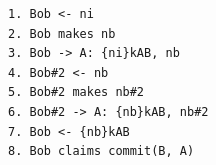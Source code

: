 \begin{lstlisting}[language={}]
1. Bob <- ni
2. Bob makes nb
3. Bob -> A: {ni}kAB, nb
4. Bob#2 <- nb
5. Bob#2 makes nb#2
6. Bob#2 -> A: {nb}kAB, nb#2
7. Bob <- {nb}kAB
8. Bob claims commit(B, A)
\end{lstlisting}
